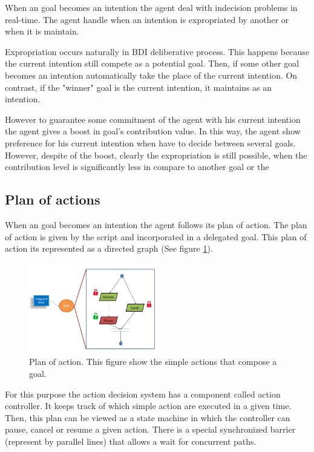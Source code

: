 When an goal becomes an intention the agent deal with indecision problems in real-time. The agent handle when an intention is expropriated by another or when it is maintain.

Expropriation occurs naturally in BDI deliberative process. This happens because the current intention still compete as a potential goal. Then, if some other goal becomes an intention automatically take the place of the current intention. On contrast, if the "winner" goal is the current intention, it maintains as an intention.

However to guarantee some commitment of the agent with his current intention the agent gives a boost in goal's contribution value. In this way, the agent show preference for his current intention when have to decide between several goals. However, despite of the boost, clearly the expropriation is still possible, when the contribution level  is significantly less in compare to another goal or the 


\subsection{Plan of actions}
When an goal becomes an intention the agent follows its plan of action. The plan of action is given by the script and incorporated in a delegated goal. This plan of action its represented as a directed graph (See figure \ref{fig:PlanOfAction}).

\begin{figure}
	\centering
	\includegraphics[width=0.5\textwidth]{Images/PlanOfAction.png} 
	\caption{Plan of action. This figure show the simple actions that compose a goal.}
	\label{fig:PlanOfAction}
\end{figure}

For this purpose the action decision system has a component called action controller. It keeps track of which simple action are executed in a given time.  Then, this plan can be viewed as a state machine in which the controller can pause, cancel or resume a given action. There is a special synchronized barrier (represent by parallel lines) that allows a wait for concurrent paths.

